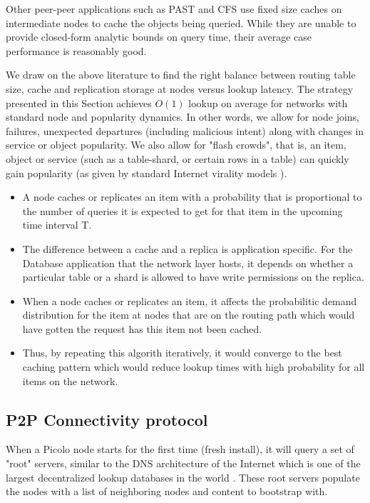 Other peer-peer applications such as PAST \cite{past} and CFS \cite{cfs} use fixed size caches on intermediate nodes to
cache the objects being queried. While they are unable to provide closed-form analytic bounds on query time, their
average case performance is reasonably good.

We draw on the above literature to find the right balance between routing table size, cache and replication storage at
nodes versus lookup latency. The strategy presented in this Section achieves \(O(1)\) lookup on average for networks with standard node
and popularity dynamics. In other words, we allow for node joins, failures, unexpected departures (including malicious
intent) along with changes in service or object popularity. We also allow for "flash crowds", that is, an item, object
or service (such as a table-shard, or certain rows in a table) can quickly gain popularity (as given by standard
Internet virality models \cite{virality_model}).

\begin{itemize}
    \item A node caches or replicates an item with a probability that is proportional to the number of queries it is
        expected to get for that item in the upcoming time interval T.
    \item The difference between a cache and a replica is application specific. For the Database application that the
        network layer hosts, it depends on whether a particular table or a shard is allowed to have write permissions on
        the replica.
    \item When a node caches or replicates an item, it affects the probabilitic demand distribution for the item at
        nodes that are on the routing path which would have gotten the request has this item not been cached.
    \item Thus, by repeating this algorith iteratively, it would converge to the best caching pattern which would reduce
        lookup times with high probability for all items on the network.
\end{itemize}

\subsection{P2P Connectivity protocol}

When a Picolo node starts for the first time (fresh install), it will query a set of "root" servers, similar to the DNS
architecture of the Internet which is one of the largest decentralized lookup databases in the world \cite{icann_root}. 
These root servers populate the nodes with a list of neighboring nodes and content to bootstrap with.

